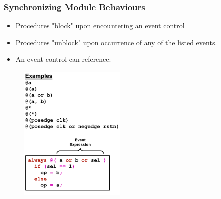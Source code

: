 \documentclass[t, notes, xcolor=table]{beamer}
\begin{document}
\begin{frame}
\frametitle{Synchronizing Module Behaviours}
\scriptsize{
\begin{multicols}{2}
\begin{itemize}
\item Procedures "block" upon encountering an event control
\item Procedures "unblock" upon occurrence of any of the listed events.
\item An event control can reference:

\end{itemize}
\vfill
\columnbreak
\begin{figure}
    \includegraphics[width=0.45\textwidth]{img/06_sync.png}
\end{figure}
\end{multicols}
}
\end{frame}
\end{document}
